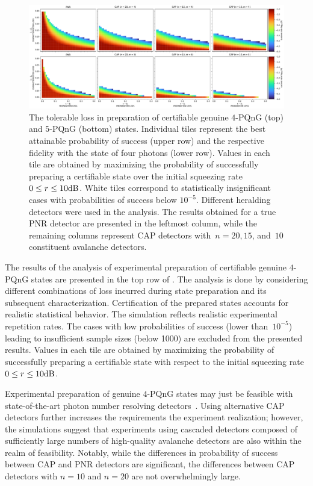 \documentclass{article}
\begin{document}
\begin{figure}[h]
  \bgroup
    \hspace*{-0.125\columnwidth}%
    \includegraphics[width = 1.25 \columnwidth]{import/202504/paper_unified_merged.pdf}
  \egroup
  \caption{
    The tolerable loss in preparation of certifiable genuine $4$-PQnG (top) and $5$-PQnG (bottom) states. Individual tiles represent the best attainable probability of success (upper row) and the respective fidelity with the state of four photons (lower row). Values in each tile are obtained by maximizing the probability of successfully preparing a certifiable state over the initial squeezing rate~${0 \leq r \leq 10\mathrm{dB}}$. White tiles correspond to statistically insignificant cases with probabilities of success below $10^{-5}$. Different heralding detectors were used in the analysis. The results obtained for a true PNR detector are presented in the leftmost column, while the remaining columns represent CAP detectors with~${n = 20, 15}$, and~$10$ constituent avalanche detectors.
  }
  \label{f-res-45}
\end{figure}


The results of the analysis of experimental preparation of certifiable genuine $4$-PQnG states are presented in the top row of . The analysis is done by considering different combinations of loss incurred during state preparation and its subsequent characterization. Certification of the prepared states accounts for realistic statistical behavior. The simulation reflects realistic experimental repetition rates. The cases with low probabilities of success (lower than~$10^{-5}$) leading to insufficient sample sizes (below 1000) are excluded from the presented results. Values in each tile are obtained by maximizing the probability of successfully preparing a certifiable state with respect to the initial squeezing rate~${0 \leq r \leq 10\mathrm{dB}}$.

Experimental preparation of genuine $4$-PQnG states may just be feasible with state-of-the-art photon number resolving detectors~\cite{endo2021,endo2024}. Using alternative CAP detectors further increases the requirements  the experiment realization; however, the simulations suggest that experiments using cascaded detectors composed of sufficiently large numbers of high-quality avalanche detectors are also within the realm of feasibility. Notably, while the differences in probability of success between CAP and PNR detectors are significant, the differences between CAP detectors with $n = 10$ and $n = 20$ are not overwhelmingly large.
\end{document}
